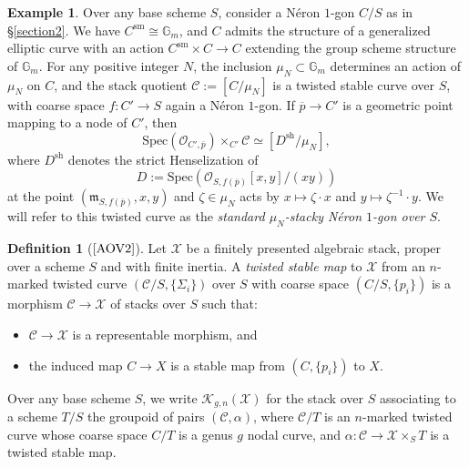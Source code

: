 \documentclass[11pt]{amsart}
\theoremstyle{definition}
\newtheorem{definition}[subsection]{Definition}
\newtheorem{example}[subsection]{Example}
\begin{document}
\begin{example}\label{stacky1gon}
Over any base scheme $S$, consider a N\'eron $1$-gon $C/S$ as in \S\ref{section2}. We have $C^{\mathrm{sm}} \cong \mathbb{G}_m$, and $C$ admits the structure of a generalized elliptic curve with an action $C^{\mathrm{sm}} \times C \rightarrow C$ extending the group scheme structure of $\mathbb{G}_m$. For any positive integer $N$, the inclusion $\mu_N \subset \mathbb{G}_m$ determines an action of $\mu_N$ on $C$, and the stack quotient ${\mathcal{C}} := [C/\mu_N]$ is a twisted stable curve over $S$, with coarse space $f:C'\rightarrow S$ again a N\'eron $1$-gon. If $\overline{p} \rightarrow C'$ is a geometric point mapping to a node of $C'$, then 
\begin{displaymath}
\mathrm{Spec}({\mathcal{O}}_{C',\overline{p}}) \times_{C'} {\mathcal{C}} \simeq [D^{\mathrm{sh}}/\mu_N],
\end{displaymath}
where $D^{\mathrm{sh}}$ denotes the strict Henselization of 
\begin{displaymath}
D := \mathrm{Spec}({\mathcal{O}}_{S,f(\overline{p})}[x,y]/(xy))
\end{displaymath}
at the point $(\mathfrak{m}_{S,f(\overline{p})},x,y)$ and $\zeta \in \mu_N$ acts by $x \mapsto \zeta \cdot x$ and $y \mapsto \zeta^{-1} \cdot y$. We will refer to this twisted curve as the \textit{standard $\mu_N$-stacky N\'eron $1$-gon over $S$}.
\end{example}

\begin{center}
\end{center}

\begin{definition}[$\textrm{\cite[\S4]{AOV2}}$]
Let ${\mathcal{X}}$ be a finitely presented algebraic stack, proper over a scheme $S$ and with finite inertia. A \textit{twisted stable map} to ${\mathcal{X}}$ from an $n$-marked twisted curve $({\mathcal{C}}/S,\{\Sigma_i\})$ over $S$ with coarse space $(C/S,\{p_i\})$ is a morphism ${\mathcal{C}} \rightarrow {\mathcal{X}}$ of stacks over $S$ such that:
\begin{itemize}
  \item ${\mathcal{C}} \rightarrow {\mathcal{X}}$ is a representable morphism, and 
  \item the induced map $C \rightarrow X$ is a stable map from $(C,\{p_i\})$ to $X$.
\end{itemize}
Over any base scheme $S$, we write ${\mathcal{K}}_{g,n}({\mathcal{X}})$ for the stack over $S$ associating to a scheme $T/S$ the groupoid of pairs $({\mathcal{C}},\alpha)$, where ${\mathcal{C}}/T$ is an $n$-marked twisted curve whose coarse space $C/T$ is a genus $g$ nodal curve, and $\alpha: {\mathcal{C}} \rightarrow {\mathcal{X}} \times_S T$ is a twisted stable map. 
\end{definition}
\end{document}

